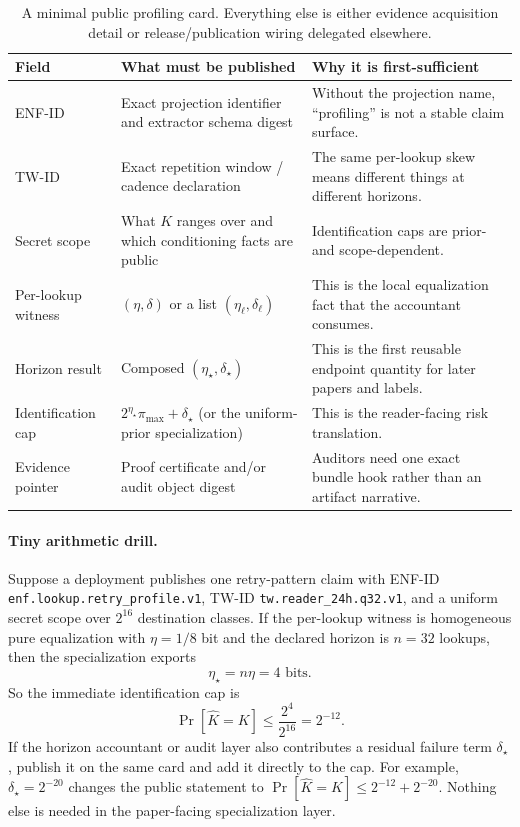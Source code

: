 \documentclass[11pt]{article}
\begin{document}
\begin{table}[t]
\centering
\small
\begin{tabularx}{\linewidth}{@{}l X X@{}}
\toprule
Field & What must be published & Why it is first-sufficient \\
\midrule
ENF-ID & Exact projection identifier and extractor schema digest & Without the projection name, ``profiling'' is not a stable claim surface. \\
TW-ID & Exact repetition window / cadence declaration & The same per-lookup skew means different things at different horizons. \\
Secret scope & What $K$ ranges over and which conditioning facts are public & Identification caps are prior- and scope-dependent. \\
Per-lookup witness & $(\eta,\delta)$ or a list $(\eta_\ell,\delta_\ell)$ & This is the local equalization fact that the accountant consumes. \\
Horizon result & Composed $(\eta_\star,\delta_\star)$ & This is the first reusable endpoint quantity for later papers and labels. \\
Identification cap & $2^{\eta_\star}\pi_{\max}+\delta_\star$ (or the uniform-prior specialization) & This is the reader-facing risk translation. \\
Evidence pointer & Proof certificate and/or audit object digest & Auditors need one exact bundle hook rather than an artifact narrative. \\
\bottomrule
\end{tabularx}
\caption{A minimal public profiling card. Everything else is either evidence acquisition detail or release/publication wiring delegated elsewhere.}
\label{tab:profiling-card}
\end{table}

\paragraph{Tiny arithmetic drill.}
Suppose a deployment publishes one retry-pattern claim with ENF-ID \texttt{enf.lookup.retry\_profile.v1}, TW-ID \texttt{tw.reader\_24h.q32.v1}, and a uniform secret scope over $2^{16}$ destination classes.
If the per-lookup witness is homogeneous pure equalization with $\eta=1/8$ bit and the declared horizon is $n=32$ lookups, then the specialization exports
\[
\eta_\star = n\eta = 4 \text{ bits}.
\]
So the immediate identification cap is
\[
\Pr[\widehat K = K] \le \frac{2^{4}}{2^{16}} = 2^{-12}.
\]
If the horizon accountant or audit layer also contributes a residual failure term $\delta_\star$, publish it on the same card and add it directly to the cap.
For example, $\delta_\star=2^{-20}$ changes the public statement to $\Pr[\widehat K = K] \le 2^{-12}+2^{-20}$.
Nothing else is needed in the paper-facing specialization layer.
\end{document}
